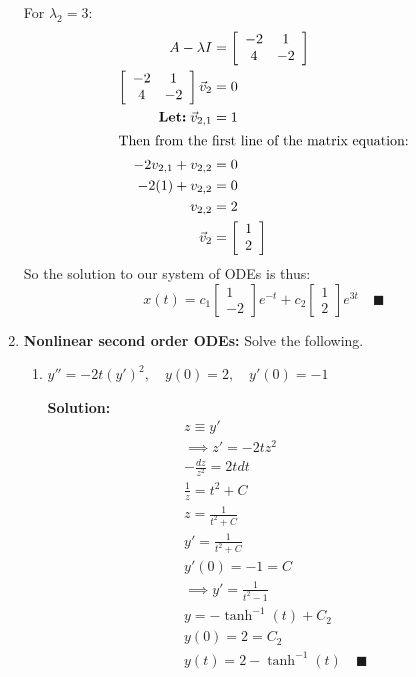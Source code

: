 \documentclass[letterpaper, fontsize=11pt]{scrartcl} %
\numberwithin{equation}{section} %
\numberwithin{figure}{section} %
\numberwithin{table}{section} %
\begin{document}
\begin{enumerate}
For $\lambda_2 = 3$:
\begin{align*}
A - \lambda I &= \left[ \begin{array}{cc} -2 & 1 \\ 4 &-2\end{array} \right]\\
\left[ \begin{array}{cc} -2 & 1 \\ 4 &-2 \end{array} \right] \vec v_2&= 0\\
\textbf{Let:} \; \vec v_{2,1} &= 1\\
\intertext{Then from the first line of the matrix equation:}
-2v_{2,1} + v_{2,2} &= 0\\
-2(1) + v_{2,2} &= 0\\
v_{2,2} &= 2\\
\vec v_2 &= \left[ \begin{array}{c} 1\\ 2 \end{array} \right]
\end{align*}
So the solution to our system of ODEs is thus:
\[
x(t) = c_1 \left[ \begin{array}{c} 1\\ -2 \end{array} \right] e^{-t} + c_2 \left[ \begin{array}{c} 1\\ 2 \end{array} \right] e^{3t} \quad\blacksquare
\]

\item \textbf{Nonlinear second order ODEs:} Solve the following. 
\begin{enumerate}

\item $y''  = -2t(y')^2, \quad y(0) = 2, \quad y'(0) = -1$
\par \textbf{Solution:}
\begin{gather*}
z \equiv y' \\
\implies z' = -2tz^2\\
-\frac{dz}{z^2} = 2tdt\\
\frac{1}{z} = t^2 + C\\
z = \frac{1}{t^2 + C}\\
y' = \frac{1}{t^2 + C}\\
y'(0) = -1 = C\\
\implies y' = \frac{1}{t^2 -1}\\
y = -\tanh^{-1}(t) + C_2\\
y(0) = 2 = C_2\\
y(t) = 2 - \tanh^{-1}(t)\quad\blacksquare
\end{gather*}


\end{enumerate}
\end{enumerate}
\end{document}
